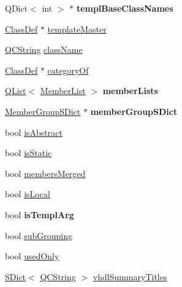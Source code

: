 \begin{DoxyCompactItemize}
\item 
\mbox{\label{class_class_def_impl_af694528f58bf5c3f872e14c364dd7f89}} 
Q\+Dict$<$ int $>$ $\ast$ {\bfseries templ\+Base\+Class\+Names}
\item 
\mbox{\hyperlink{class_class_def}{Class\+Def}} $\ast$ \mbox{\hyperlink{class_class_def_impl_a14389d44bce551c00b53391115004d5f}{template\+Master}}
\item 
\mbox{\hyperlink{class_q_c_string}{Q\+C\+String}} \mbox{\hyperlink{class_class_def_impl_a5eecc11f35a74b7ac718fc46b9d8de26}{class\+Name}}
\item 
\mbox{\hyperlink{class_class_def}{Class\+Def}} $\ast$ \mbox{\hyperlink{class_class_def_impl_aa33f23ac88249219ec76053a54684ae8}{category\+Of}}
\item 
\mbox{\label{class_class_def_impl_a08ae5698e8b933ec25f894f6e87ad1b1}} 
\mbox{\hyperlink{class_q_list}{Q\+List}}$<$ \mbox{\hyperlink{class_member_list}{Member\+List}} $>$ {\bfseries member\+Lists}
\item 
\mbox{\label{class_class_def_impl_a0210b427b08a04f20bd5eb24c3bb6f11}} 
\mbox{\hyperlink{class_member_group_s_dict}{Member\+Group\+S\+Dict}} $\ast$ {\bfseries member\+Group\+S\+Dict}
\item 
bool \mbox{\hyperlink{class_class_def_impl_add7ec887a9774fff23c51033b0f68cd1}{is\+Abstract}}
\item 
bool \mbox{\hyperlink{class_class_def_impl_a13a7bfbb253abb17959c8fa78d565c51}{is\+Static}}
\item 
bool \mbox{\hyperlink{class_class_def_impl_ab613a11051f5ad3265ddc3b25ef50a82}{members\+Merged}}
\item 
bool \mbox{\hyperlink{class_class_def_impl_a9a751bb93d4da92aceace3210c911aa1}{is\+Local}}
\item 
\mbox{\label{class_class_def_impl_a3a2227e55d99c40327f87f5efe096061}} 
bool {\bfseries is\+Templ\+Arg}
\item 
bool \mbox{\hyperlink{class_class_def_impl_ad11ebe89f9a6c199c5ef2b63ef2a10cc}{sub\+Grouping}}
\item 
bool \mbox{\hyperlink{class_class_def_impl_aef5aa0ec452605576f9a976067326e52}{used\+Only}}
\item 
\mbox{\hyperlink{class_s_dict}{S\+Dict}}$<$ \mbox{\hyperlink{class_q_c_string}{Q\+C\+String}} $>$ \mbox{\hyperlink{class_class_def_impl_a1ab8fae1f7661cf9461678debaf0c5f7}{vhdl\+Summary\+Titles}}

\end{DoxyCompactItemize}
